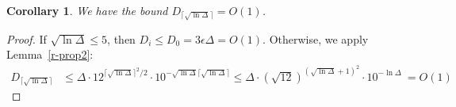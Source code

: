\documentclass[11pt]{amsart}
\newtheorem{corollary}[theorem]{Corollary}
\begin{document}
\begin{corollary}
\label{cor-dbound}
We have the bound $D_{\lceil \sqrt{\ln \Delta} \rceil} = O(1)$.
\end{corollary}
\begin{proof}
If $\sqrt{\ln \Delta} \leq 5$, then $D_i \leq D_0 = 3 \epsilon \Delta = O(1)$. Otherwise, we apply Lemma~\ref{r-prop2}:
\begin{align*}
D_{\lceil \sqrt{\ln \Delta} \rceil} &\leq  \Delta \cdot 12^{\lceil \sqrt{\ln\Delta} \rceil^2 /2} \cdot 10^{- \sqrt{\ln\Delta} \lceil{\sqrt{\ln \Delta} \rceil}} \leq  \Delta \cdot (\sqrt{12})^{(\sqrt{\ln\Delta} + 1)^2} \cdot 10^{-\ln\Delta} \ = O(1)
\end{align*}
\end{proof}

\iffalse
\textbf{Expository remark:} Corollary~\ref{cor-dbound} explains why we selected $\epsilon = \exp(-\Theta(\sqrt{\log \Delta}))$ and ran our coloring steps for $O(\sqrt{\log \Delta})$ rounds. Suppose instead we set~$\epsilon = \exp(-\ln^a \Delta)$ and ran $\ln^a \Delta$ dense coloring steps, for some~$a < 1/2$. At the end of these steps, we would have $D_{\ln^a \Delta} = \Delta \exp(-\ln^{2 a} \Delta)$. This is close to $\Delta$ (differing in only a sub-polynomial term), which implies that we have hardly made any progress in reducing the number of uncolored vertices.
\fi
\end{document}
